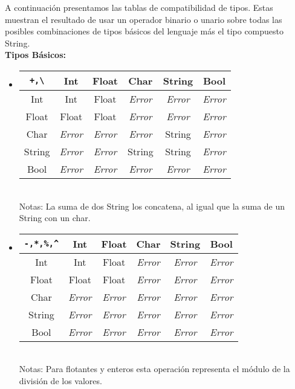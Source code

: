 \documentclass[12pt, spanish]{report}
\begin{document}
\indent A continuaci\'on presentamos las tablas de compatibilidad de
tipos. Estas muestran el resultado de usar un operador binario o unario sobre
todas las posibles combinaciones de tipos b\'asicos del lenguaje m\'as
el tipo compuesto String.\\

\textbf{Tipos B\'asicos:}
\begin{itemize}
\item
\begin{tabular}{|c||ccccc|}
	\hline
\texttt{+,\textbackslash}  &  Int  & Float & Char  & String & Bool  \\
	\hline \hline
Int    & Int          & Float        & \emph{Error} & \emph{Error} & \emph{Error} \\
Float  & Float        & Float        & \emph{Error} & \emph{Error} & \emph{Error}\\
Char   & \emph{Error} & \emph{Error} & \emph{Error} & String       & \emph{Error}\\
String & \emph{Error} & \emph{Error} & String       & String       & \emph{Error}\\
Bool   & \emph{Error} & \emph{Error} & \emph{Error} & \emph{Error} & \emph{Error}\\
	\hline
\end{tabular}\\

Notas: La suma de dos String los concatena, al igual que la suma de un String
con un char.

\item
\begin{tabular}{|c||ccccc|}
	\hline
\texttt{-,*,\%,\^}  &  Int  & Float & Char  & String & Bool  \\
	\hline \hline
Int    & Int   & Float & \emph{Error} & \emph{Error} & \emph{Error}\\
Float  & Float & Float & \emph{Error} & \emph{Error} & \emph{Error}\\
Char   & \emph{Error} & \emph{Error} & \emph{Error} & \emph{Error} & \emph{Error} \\
String & \emph{Error} & \emph{Error} & \emph{Error} & \emph{Error} & \emph{Error} \\
Bool   & \emph{Error} & \emph{Error} & \emph{Error} & \emph{Error} & \emph{Error} \\
	\hline
\end{tabular}\\

Notas: Para flotantes y enteros esta operaci\'on representa el m\'odulo de la
divisi\'on de los valores.\\


\end{itemize}
\end{document}
